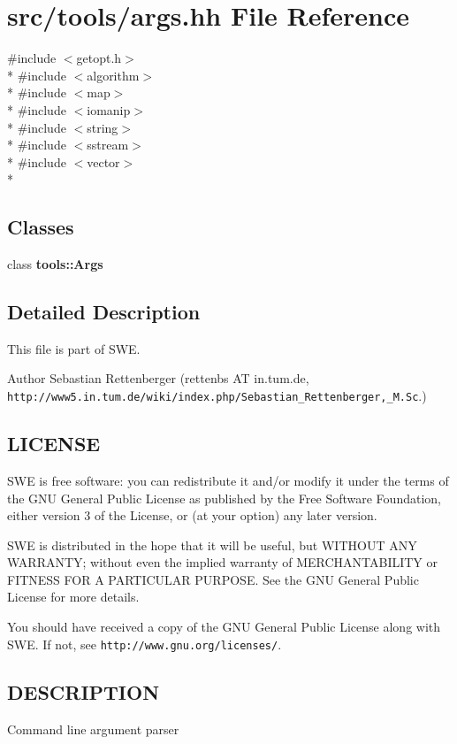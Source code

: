 \section{src/tools/args.hh File Reference}
\label{args_8hh}
{\ttfamily \#include $<$getopt.\-h$>$}\\*
{\ttfamily \#include $<$algorithm$>$}\\*
{\ttfamily \#include $<$map$>$}\\*
{\ttfamily \#include $<$iomanip$>$}\\*
{\ttfamily \#include $<$string$>$}\\*
{\ttfamily \#include $<$sstream$>$}\\*
{\ttfamily \#include $<$vector$>$}\\*
\subsection*{Classes}
\begin{DoxyCompactItemize}
\item 
class {\bf tools\-::\-Args}
\end{DoxyCompactItemize}


\subsection{Detailed Description}
This file is part of S\-W\-E.

\begin{DoxyAuthor}{Author}
Sebastian Rettenberger (rettenbs A\-T in.\-tum.\-de, {\tt http\-://www5.\-in.\-tum.\-de/wiki/index.\-php/\-Sebastian\-\_\-\-Rettenberger,\-\_\-\-M.\-Sc}.)
\end{DoxyAuthor}
\subsection{L\-I\-C\-E\-N\-S\-E}\label{Writer_8hh_LICENSE}
S\-W\-E is free software\-: you can redistribute it and/or modify it under the terms of the G\-N\-U General Public License as published by the Free Software Foundation, either version 3 of the License, or (at your option) any later version.

S\-W\-E is distributed in the hope that it will be useful, but W\-I\-T\-H\-O\-U\-T A\-N\-Y W\-A\-R\-R\-A\-N\-T\-Y; without even the implied warranty of M\-E\-R\-C\-H\-A\-N\-T\-A\-B\-I\-L\-I\-T\-Y or F\-I\-T\-N\-E\-S\-S F\-O\-R A P\-A\-R\-T\-I\-C\-U\-L\-A\-R P\-U\-R\-P\-O\-S\-E. See the G\-N\-U General Public License for more details.

You should have received a copy of the G\-N\-U General Public License along with S\-W\-E. If not, see {\tt http\-://www.\-gnu.\-org/licenses/}.\subsection{D\-E\-S\-C\-R\-I\-P\-T\-I\-O\-N}\label{NetCdfWriter_8hh_DESCRIPTION}
Command line argument parser 